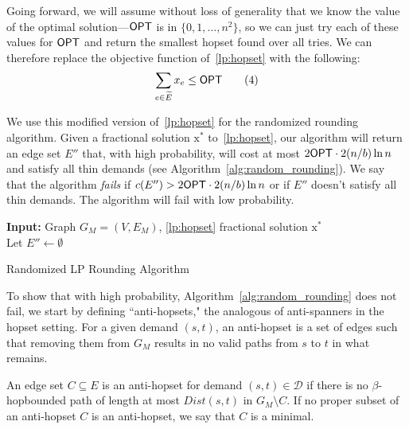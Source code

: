 Going forward, we will assume without loss of generality that we know the value of the optimal solution---${{\sf OPT}}$ is in $\{0, 1, \dots, n^2 \}$, so we can just try each of these values for ${{\sf OPT}}$ and return the smallest hopset found over all tries. We can therefore replace the objective function of~\ref{lp:hopset} with the following:
\begin{align*}
    \sum_{e \in \widetilde{E}} x_e \leq {{\sf OPT}} \tag{4}
\end{align*}

We use this modified version of~\ref{lp:hopset} for the randomized rounding algorithm. Given a fractional solution $\bm{\mathrm{x}}^*$ to~\ref{lp:hopset}, our algorithm will return an edge set $E''$ that, with high probability, will cost at most $2{{\sf OPT}} \cdot 2(n/b)  \ln{n}$ and satisfy all thin demands (see Algorithm~\ref{alg:random_rounding}). We say that the algorithm \textit{fails} if $c(E'') > 2{{\sf OPT}} \cdot 2(n/b)  \ln{n}$ or if $E''$ doesn't satisfy all thin demands. The algorithm will fail with low probability.

\begin{algorithm}[h]
\DontPrintSemicolon

\textbf{Input:} Graph $G_M = (V, E_M)$, \ref{lp:hopset} fractional solution $\bm{\mathrm{x}}^*$ \\

Let $E'' \gets \emptyset$ \; \;

 \;

    

\caption{\label{alg:random_rounding} Randomized LP Rounding Algorithm }
\end{algorithm}

To show that with high probability, Algorithm~\ref{alg:random_rounding} does not fail, we start by defining ``anti-hopsets," the analogous of anti-spanners in the hopset setting. For a given demand $(s,t)$, an anti-hopset is a set of edges such that removing them from $G_M$ results in no valid paths from $s$ to $t$ in what remains.

\begin{definition}
    An edge set $C \subseteq E$ is an anti-hopset for demand $(s,t) \in \mathcal{D}$ if there is no $\beta$-hopbounded path of length at most $Dist(s,t)$ in $G_M \setminus C$. If no proper subset of an anti-hopset $C$ is an anti-hopset, we say that $C$ is a minimal.
\end{definition}

